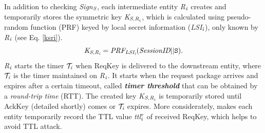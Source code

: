 In addition to checking \emph{Sign}$_{\emph{S}}$, each intermediate entity \emph{R}$_\emph{i}$ creates and temporarily stores the symmetric key \emph{K}$_{\emph{S,R}_\emph{i}}$, which is calculated using pseudo-random function (PRF) keyed by local secret information (\emph{LSI}$_\emph{i}$), only known by \emph{R}$_\emph{i}$ (see Eq. \ref{ksri}).
\begin{equation}\label{ksri}
\emph{K}_{\emph{S}, \emph{R}_\emph{i}} = \emph{PRF}_{\emph{LSI}_\emph{i}}(\emph{SessionID} \vert \vert {\tt S}).
\end{equation}
\emph{R}$_\emph{i}$ starts the timer $\mathcal{T}_\emph{i}$ when ReqKey is delivered to the downstream entity, where $\mathcal{T}_\emph{i}$ is the timer maintained on \emph{R}$_\emph{i}$. 
It starts when the request package arrives and expires after a certain timeout, called \emph{\textbf{timer threshold}} that can be obtained by a \emph{round-trip time} (RTT). 
The created key \emph{K}$_{\emph{S,R}_\emph{i}}$ is temporarily stored until AckKey (detailed shortly) comes or $\mathcal{T}_\emph{i}$ expires. More considerately, \namekey{} makes each entity temporarily record the TTL value \emph{ttl}$_\emph{i}^\emph{r}$ of received ReqKey, which helps to avoid TTL attack.
\vspace{-0.1in}
